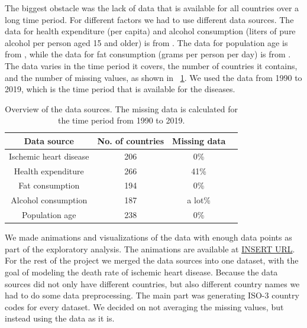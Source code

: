 The biggest obstacle was the lack of data that is available for all countries over a long time period. For different factors we had to use different data sources.
The data for health expenditure (per capita) and alcohol consumption (liters of pure alcohol per person aged 15 and older) is from \citet{oecd}. 
The data for population age is from \citet{age}, while the data for fat consumption (grams per person per day) is from \citet{fat_consumption}. The data varies in the time period it covers,
the number of countries it contains, and the number of missing values, as shown in \tablename~\ref{Data overview}. We used the data from 1990 to 2019, which is the time period
that is available for the diseases.

\begin{table}[h]
    \centering
    \caption{Overview of the data sources. The missing data is calculated for the time period from 1990 to 2019.}
    \label{Data overview}
    \begin{tabular}{|c|c|c|c|}
    \hline
    Data source & No. of countries & Missing data\\
    \hline
    Ischemic heart disease & 206 & 0\%\\
    Health expenditure & 266 & 41\%\\
    Fat consumption & 194 & 0\%\\
    Alcohol consumption & 187 & a lot\%\\
    Population age & 238 & 0\%\\
    \hline
    \end{tabular}
\end{table}

We made animations and visualizations of the data with enough data points as part of the exploratory analysis. The animations are available at \url{INSERT URL}. 
For the rest of the project we merged the data sources into one dataset, with the goal of modeling the death rate of ischemic heart disease. Because the data sources did not 
only have different countries, but also different country names we had to do some data preprocessing. The main part was generating ISO-3 country codes for every dataset. 
We decided on not averaging the missing values, but instead using the data as it is.